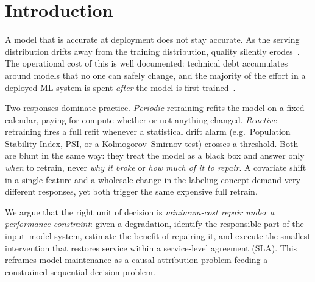 \documentclass[conference]{IEEEtran}
\begin{document}
\section{Introduction}
A model that is accurate at deployment does not stay accurate. As the
serving distribution drifts away from the training distribution, quality
silently erodes~\cite{gama2014survey,lu2018learning,quinonero2009dataset}.
The operational cost of this is well documented: technical debt
accumulates around models that no one can safely change, and the majority
of the effort in a deployed ML system is spent \emph{after} the model is
first trained~\cite{sculley2015debt,paleyes2022challenges}.

Two responses dominate practice. \emph{Periodic} retraining refits the
model on a fixed calendar, paying for compute whether or not anything
changed. \emph{Reactive} retraining fires a full refit whenever a
statistical drift alarm (e.g.\ Population Stability Index, PSI, or a
Kolmogorov--Smirnov test) crosses a threshold. Both are blunt in the same
way: they treat the model as a black box and answer only \emph{when} to
retrain, never \emph{why it broke} or \emph{how much of it to repair}. A
covariate shift in a single feature and a wholesale change in the labeling
concept demand very different responses, yet both trigger the same
expensive full retrain.

We argue that the right unit of decision is \emph{minimum-cost repair
under a performance constraint}: given a degradation, identify the
responsible part of the input--model system, estimate the benefit of
repairing it, and execute the smallest intervention that restores service
within a service-level agreement (SLA). This reframes model maintenance as
a causal-attribution problem feeding a constrained sequential-decision
problem.
\end{document}
